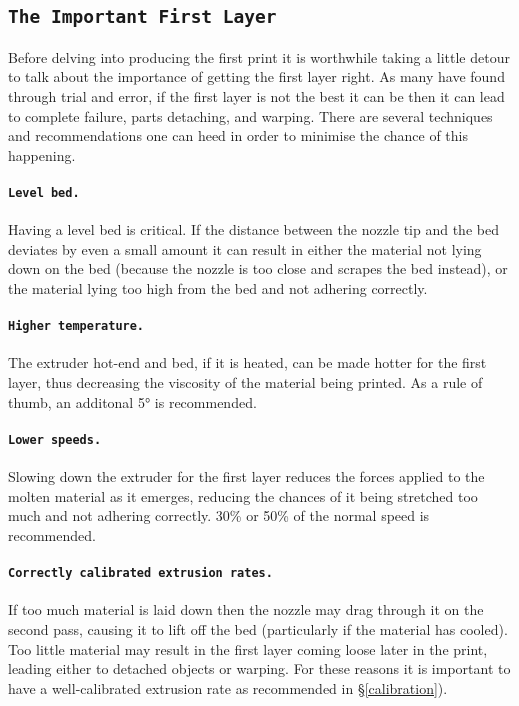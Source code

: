 
\subsection{\texttt{The Important First Layer}}
\label{sec:the_important_first_layer}
Before delving into producing the first print it is worthwhile taking a little detour to talk about the importance of getting the first layer right.  As many have found through trial and error, if the first layer is not the best it can be then it can lead to complete failure, parts detaching, and warping.  There are several techniques and recommendations one can heed in order to minimise the chance of this happening.

\paragraph{\texttt{Level bed.}} %
\label{par:level_bed}
Having a level bed is critical.  If the distance between the nozzle tip and the bed deviates by even a small amount it can result in either the material not lying down on the bed (because the nozzle is too close and scrapes the bed instead), or the material lying too high from the bed and not adhering correctly.

\paragraph{\texttt{Higher temperature.}} %
\label{par:higher_temperature}
The extruder hot-end and bed, if it is heated, can be made hotter for the first layer, thus decreasing the viscosity of the material being printed.  As a rule of thumb, an additonal 5° is recommended.

\paragraph{\texttt{Lower speeds.}} %
\label{par:lower_speeds}
Slowing down the extruder for the first layer reduces the forces applied to the molten material as it emerges, reducing the chances of it being stretched too much and not adhering correctly.  30\% or 50\% of the normal speed is recommended.

\paragraph{\texttt{Correctly calibrated extrusion rates.}} %
\label{par:correct_extrusion_settings}
If too much material is laid down then the nozzle may drag through it on the second pass, causing it to lift off the bed (particularly if the material has cooled).  Too little material may result in the first layer coming loose later in the print, leading either to detached objects or warping.  For these reasons it is important to have a well-calibrated extrusion rate as recommended in §\ref{calibration}).

